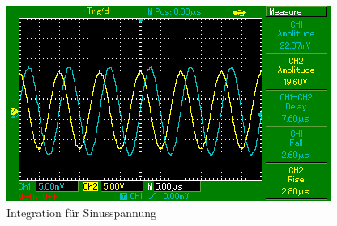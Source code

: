 \begin{figure}
  \includegraphics{content/Bilder/sinus_integral.jpg}
  \caption{Integration für Sinusspannung}
  \label{fig:sinusint}
\end{figure}
